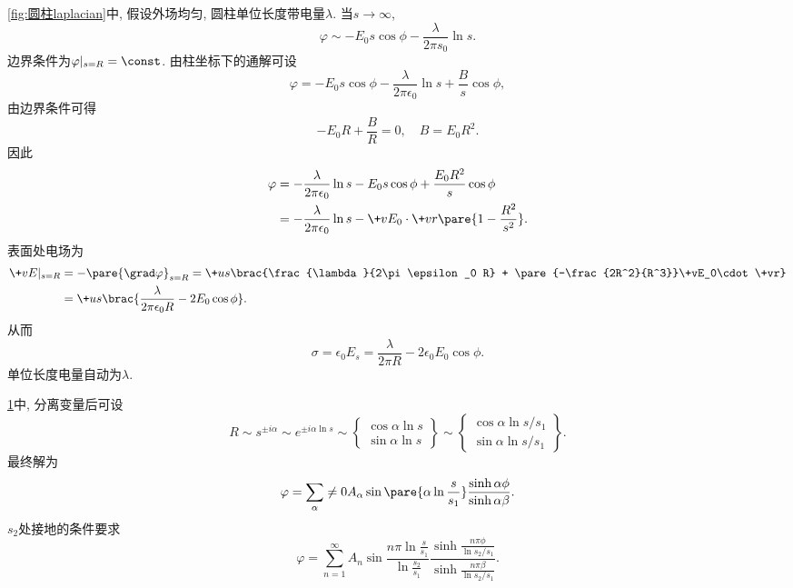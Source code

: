 \documentclass[hidelinks]{ctexart}
\begin{document}
\begin{sample}
    \begin{ex}
        \cref{fig:圆柱laplacian}中, 假设外场均匀, 圆柱单位长度带电量$\lambda$. 当$s\rightarrow\infty$,
        \[ \varphi \sim -E_0 s\cos\phi - \frac{\lambda}{2\pi s_0}\ln s. \]
        边界条件为$\varphi\vert_{s=R} = \const$. 由柱坐标下的通解可设
        \[ \varphi = -E_0 s\cos\phi - \frac{\lambda}{2\pi\epsilon_0}\ln s + \frac{B}{s}\cos\phi, \]
        由边界条件可得
        \[ -E_0 R + \frac{B}{R} = 0,\quad B = E_0 R^2. \]
        因此
        \begin{align*}
            \varphi &= -\frac{\lambda}{2\pi\epsilon_0} \ln s - E_0 s\cos\phi + \frac{E_0 R^2}{s}\cos\phi \\
            &= -\frac{\lambda}{2\pi \epsilon_0} \ln s - \+vE_0\cdot \+vr\pare{1-\frac{R^2}{s^2}}.
        \end{align*}
        表面处电场为
        \begin{align*}
            \+vE\vert_{s=R} &= -\pare{\grad \varphi}_{s=R} = \+us \brac{\frac{\lambda}{2\pi\epsilon_0 R} + \pare{-\frac{2R^2}{R^3}}\+vE_0\cdot \+vr} \\
            &= \+us \brac{\frac{\lambda}{2\pi\epsilon_0 R} - 2E_0\cos\phi}.
        \end{align*}
        从而
        \[ \sigma = \epsilon_0 E_s = \frac{\lambda}{2\pi R} - 2\epsilon_0 E_0 \cos\phi. \]
        单位长度电量自动为$\lambda$.
    \end{ex}
\end{sample}
\begin{figure}[ht]
    \centering
    \caption{}
    \label{fig:扇形laplacian}
\end{figure}
\begin{sample}
    \begin{ex}
        \cref{fig:扇形laplacian}中, 分离变量后可设
        \[ R \sim s^{\pm i\alpha} \sim e^{\pm i\alpha \ln s} \sim \left\{\begin{aligned}
            \cos \alpha \ln s \\
            \sin \alpha \ln s
        \end{aligned}\right\} \sim \left\{\begin{aligned}
            \cos \alpha \ln s/s_1 \\
            \sin \alpha \ln s/s_1
        \end{aligned}\right\}. \]
        最终解为
        \[ \varphi = \sum_\alpha \neq 0 A_\alpha \sin \pare{\alpha \ln \frac{s}{s_1}}\frac{\sinh \alpha \phi}{\sinh \alpha\beta}. \]
        $s_2$处接地的条件要求
        \[ \varphi = \sum_{n=1}^\infty A_n \sin \frac{n\pi \ln \frac{s}{s_1}}{\ln \frac{s_2}{s_1}} \frac{\sinh \frac{n\pi \phi}{\ln s_2/s_1}}{\sinh \frac{n\pi\beta}{\ln s_2/s_1}}. \]
    \end{ex}
\end{sample}
\end{document}
